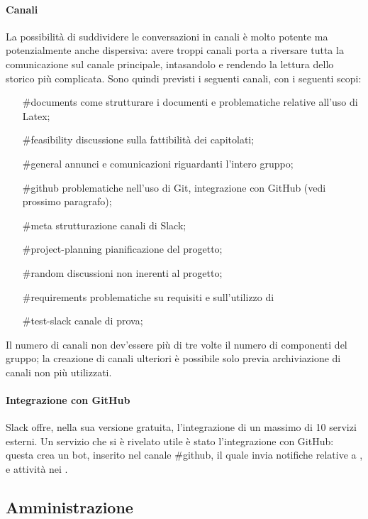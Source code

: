 			\paragraph{Canali} 
				La possibilità di suddividere le conversazioni in canali è molto potente ma potenzialmente anche dispersiva: avere troppi canali porta a riversare tutta la comunicazione sul canale principale, intasandolo e rendendo la lettura dello storico più complicata. Sono quindi previsti i seguenti canali, con i seguenti scopi:
				\begin{itemize}
					\item[\#documents] come strutturare i documenti e problematiche relative all'uso di Latex;
					\item[\#feasibility] discussione sulla fattibilità dei capitolati;
					\item[\#general] annunci e comunicazioni riguardanti l'intero gruppo;
					\item[\#github] problematiche nell'uso di Git, integrazione con GitHub (vedi prossimo paragrafo);
					\item[\#meta] strutturazione canali di Slack;
					\item[\#project-planning] pianificazione del progetto;
					\item[\#random] discussioni non inerenti al progetto;
					\item[\#requirements] problematiche su requisiti e sull'utilizzo di 
					\item[\#test-slack] canale di prova;
				\end{itemize}
				Il numero di canali non dev'essere più di tre volte il numero di componenti del gruppo; la creazione di canali ulteriori è possibile solo previa archiviazione di canali non più utilizzati.
			\paragraph{Integrazione con GitHub} 
				Slack offre, nella sua versione gratuita, l'integrazione di un massimo di 10 servizi esterni. Un servizio che si è rivelato utile è stato l'integrazione con GitHub: questa crea un bot, inserito nel canale \#github, il quale invia notifiche relative a ,  e attività nei .
			
	
	
	\subsection{Amministrazione}
	
